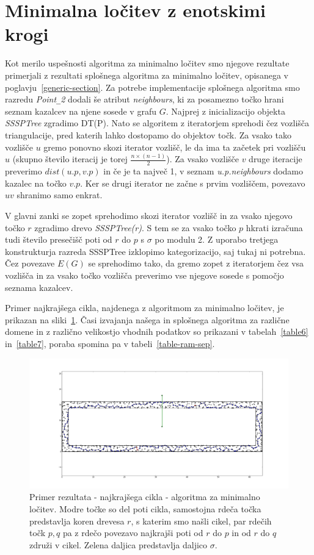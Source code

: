 \documentclass[a4paper, 12pt]{book}
\newcommand{\U}{\texttt{\_}}
\begin{document}
\section{Minimalna ločitev z enotskimi krogi}
Kot merilo uspešnosti algoritma za minimalno ločitev smo njegove rezultate primerjali z rezultati splošnega algoritma za minimalno ločitev, opisanega v poglavju~\ref{generic-section}. Za potrebe implementacije splošnega algoritma smo razredu \textit{Point\U 2} dodali še atribut \textit{neighbours}, ki za posamezno točko hrani seznam kazalcev na njene sosede v grafu $G$. Najprej z inicializacijo objekta \textit{SSSP\-Tree} zgradimo DT(P). Nato se algoritem z iteratorjem sprehodi čez vozlišča triangulacije, pred katerih lahko dostopamo do objektov točk. Za vsako tako vozlišče $u$ gremo ponovno skozi iterator vozlišč, le da ima ta začetek pri vozlišču $u$ (skupno število iteracij je torej $\frac{n\times (n-1)}{2}$). Za vsako vozlišče $v$ druge iteracije preverimo $dist(u.p,v.p)$ in če je ta največ 1, v seznam \textit{u.p.neighbours} dodamo kazalec na točko $v.p$. Ker se drugi iterator ne začne s prvim vozliščem, povezavo $uv$ shranimo samo enkrat.

V glavni zanki se zopet sprehodimo skozi iterator vozlišč in za vsako njegovo točko $r$ zgradimo drevo \textit{SSSP\-Tree(r)}. S tem se za vsako točko $p$ hkrati izračuna tudi število presečišč poti od $r$ do $p$ s $\sigma$ po modulu 2. Z uporabo tretjega konstrukturja razreda SSSPTree izklopimo kategorizacijo, saj tukaj ni potrebna. Čez povezave $E(G)$ se sprehodimo tako, da gremo zopet z iteratorjem čez vsa vozlišča in za vsako točko vozlišča preverimo vse njegove sosede s pomočjo seznama kazalcev.  

Primer najkrajšega cikla, najdenega z algoritmom za minimalno ločitev, je prikazan na sliki~\ref{sep-64-1-1000-narrow}. Časi izvajanja našega in splošnega algoritma za različne domene in z različno velikostjo vhodnih podatkov so prikazani v tabelah~\ref{table6} in~\ref{table7}, poraba spomina pa v tabeli~\ref{table-ram-sep}.

\begin{figure}[htp]
\centerline{\includegraphics[scale=0.3]{pics/separation-64-1-1000-narrow-2.png}}
\caption{Primer rezultata - najkrajšega cikla - algoritma za minimalno ločitev. Modre točke so del poti cikla, samostojna rdeča točka predstavlja koren drevesa $r$, s katerim smo našli cikel, par rdečih točk $p,q$ pa z rdečo povezavo najkrajši poti od $r$ do $p$ in od $r$ do $q$ združi v cikel. Zelena daljica predstavlja daljico $\sigma$.}
\label{sep-64-1-1000-narrow}
\end{figure}
\end{document}
